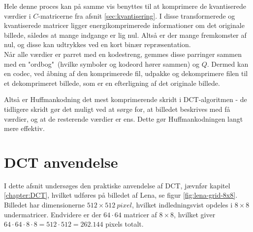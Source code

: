 Hele denne proces kan på samme vis benyttes til at komprimere de kvantiserede værdier i $C$-matricerne fra afsnit \ref{sec:kvantisering}. I disse transformerede og kvantiserede matricer ligger energikomprimerede informationer om det originale billede, således at mange indgange er lig nul. Altså er der mange fremkomster af nul, og disse kan udtrykkes ved en kort binær repræsentation.\\
Når alle værdier er parret med en kodestreng, gemmes disse parringer sammen med en "ordbog"\ (hvilke symboler og kodeord hører sammen) og $Q$. Dermed kan en codec, ved åbning af den komprimerede fil, udpakke og dekomprimere filen til et dekomprimeret billede, som er en efterligning af det originale billede.

Altså er Huffmankodning det mest komprimerende skridt i DCT-algoritmen - de tidligere skridt gør det muligt ved at sørge for, at billedet beskrives med få værdier, og at de resterende værdier er ens. Dette gør Huffmankodningen langt mere effektiv.
\section{DCT anvendelse} \label{sec:DCTAnvendelse}
I dette afsnit undersøges den praktiske anvendelse af DCT, jævnfør kapitel \ref{chapter:DCT}, hvilket udføres på billedet af Lena, se figur \vref{fig:lena-grid-8x8}. Billedet har dimensionerne $ 512 \times \SI{512}{pixel}$, hvilket indledningsvist opdeles i $8 \times 8$ undermatricer. Endvidere er der $ 64 \cdot 64$ matricer af $8 \times 8$, hvilket giver $64 \cdot 64 \cdot 8 \cdot 8 = 512 \cdot 512 = 262.144$ pixels totalt.

